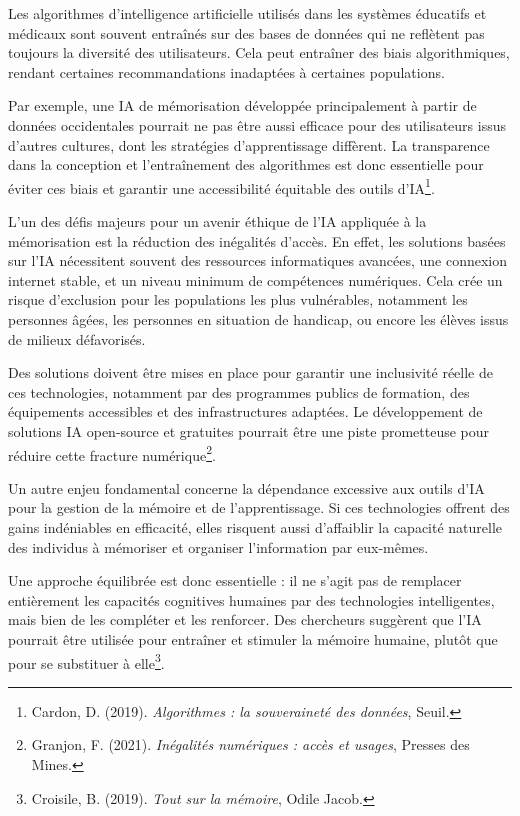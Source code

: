 \documentclass[11pt,a4paper]{report}
\begin{document}
Les algorithmes d’intelligence artificielle utilisés dans les systèmes éducatifs et médicaux sont souvent entraînés sur des bases de données qui ne reflètent pas toujours la diversité des utilisateurs. Cela peut entraîner des biais algorithmiques, rendant certaines recommandations inadaptées à certaines populations.

Par exemple, une IA de mémorisation développée principalement à partir de données occidentales pourrait ne pas être aussi efficace pour des utilisateurs issus d’autres cultures, dont les stratégies d’apprentissage diffèrent. La transparence dans la conception et l’entraînement des algorithmes est donc essentielle pour éviter ces biais et garantir une accessibilité équitable des outils d’IA\footnote{Cardon, D. (2019). \textit{Algorithmes : la souveraineté des données}, Seuil.}.

L’un des défis majeurs pour un avenir éthique de l’IA appliquée à la mémorisation est la réduction des inégalités d’accès. En effet, les solutions basées sur l’IA nécessitent souvent des ressources informatiques avancées, une connexion internet stable, et un niveau minimum de compétences numériques. Cela crée un risque d’exclusion pour les populations les plus vulnérables, notamment les personnes âgées, les personnes en situation de handicap, ou encore les élèves issus de milieux défavorisés.

Des solutions doivent être mises en place pour garantir une inclusivité réelle de ces technologies, notamment par des programmes publics de formation, des équipements accessibles et des infrastructures adaptées. Le développement de solutions IA open-source et gratuites pourrait être une piste prometteuse pour réduire cette fracture numérique\footnote{Granjon, F. (2021). \textit{Inégalités numériques : accès et usages}, Presses des Mines.}.

Un autre enjeu fondamental concerne la dépendance excessive aux outils d’IA pour la gestion de la mémoire et de l’apprentissage. Si ces technologies offrent des gains indéniables en efficacité, elles risquent aussi d’affaiblir la capacité naturelle des individus à mémoriser et organiser l’information par eux-mêmes.

Une approche équilibrée est donc essentielle : il ne s’agit pas de remplacer entièrement les capacités cognitives humaines par des technologies intelligentes, mais bien de les compléter et les renforcer. Des chercheurs suggèrent que l’IA pourrait être utilisée pour entraîner et stimuler la mémoire humaine, plutôt que pour se substituer à elle\footnote{Croisile, B. (2019). \textit{Tout sur la mémoire}, Odile Jacob.}.
\end{document}
